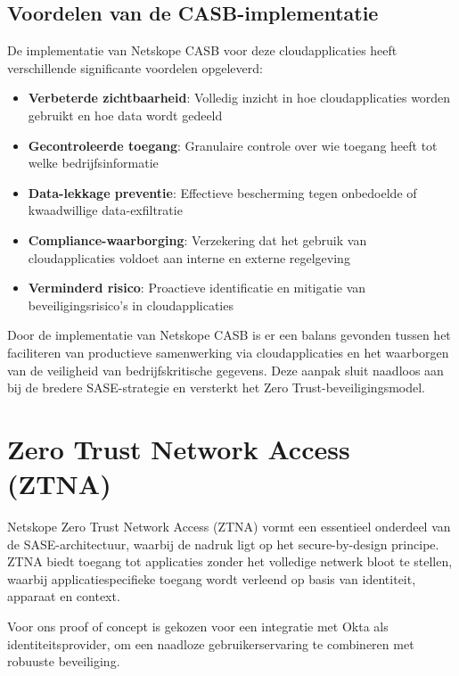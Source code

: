 \subsection{Voordelen van de CASB-implementatie}

De implementatie van Netskope CASB voor deze cloudapplicaties heeft verschillende significante voordelen opgeleverd:

\begin{itemize}
    \item \textbf{Verbeterde zichtbaarheid}: Volledig inzicht in hoe cloudapplicaties worden gebruikt en hoe data wordt gedeeld
    \item \textbf{Gecontroleerde toegang}: Granulaire controle over wie toegang heeft tot welke bedrijfsinformatie
    \item \textbf{Data-lekkage preventie}: Effectieve bescherming tegen onbedoelde of kwaadwillige data-exfiltratie
    \item \textbf{Compliance-waarborging}: Verzekering dat het gebruik van cloudapplicaties voldoet aan interne en externe regelgeving
    \item \textbf{Verminderd risico}: Proactieve identificatie en mitigatie van beveiligingsrisico's in cloudapplicaties
\end{itemize}

Door de implementatie van Netskope CASB is er een balans gevonden tussen het faciliteren van productieve samenwerking via cloudapplicaties en het waarborgen van de veiligheid van bedrijfskritische gegevens. Deze aanpak sluit naadloos aan bij de bredere SASE-strategie en versterkt het Zero Trust-beveiligingsmodel.

\section{Zero Trust Network Access (ZTNA)}
Netskope Zero Trust Network Access (ZTNA) vormt een essentieel onderdeel van de SASE-architectuur, waarbij de nadruk ligt op het secure-by-design principe. ZTNA biedt toegang tot applicaties zonder het volledige netwerk bloot te stellen, waarbij applicatiespecifieke toegang wordt verleend op basis van identiteit, apparaat en context. 

\vspace{2ex}

Voor ons proof of concept is gekozen voor een integratie met Okta als identiteitsprovider, om een naadloze gebruikerservaring te combineren met robuuste beveiliging.

